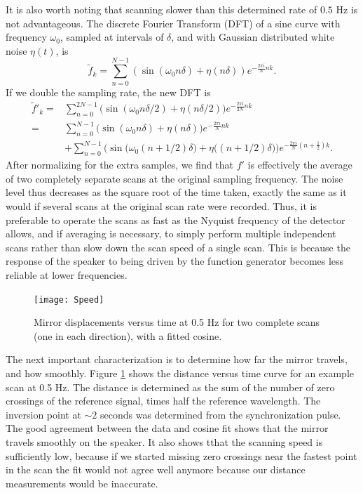 \documentclass[12pt]{puthesis}
\begin{document}
It is also worth noting that scanning slower than this determined rate of $0.5$ Hz is not advantageous. The discrete Fourier Transform (DFT) of a sine curve with frequency $\omega_{0}$, sampled at intervals of $\delta$, and with Gaussian distributed white noise $\eta(t)$, is 
\begin{equation}\label{eq:10}
\tilde f_{k} = \sum_{n=0}^{N-1}\left(\sin (\omega_{0}n\delta) +\eta(n\delta)\right)e^{-\frac{2\pi i}{N}nk}. 
\end{equation}
If we double the sampling rate, the new DFT is 
\begin{align}
  \tilde f'_{k}
  =& \sum_{n=0}^{2N-1}\Big(\sin(\omega_{0}n\delta/2) + \eta(n\delta/2)\Big)e^{-\frac{2\pi i}{2N}nk}\nonumber \\
  =& \sum_{n=0}^{N-1}\Big(\sin(\omega_{0}n\delta)+\eta(n\delta)\Big)e^{-\frac{2\pi i}{N}nk}\nonumber \\
  &+ \sum_{n=0}^{N-1}\Big(\sin\big(\omega_{0}(n+1/2)\delta\big) + \eta\big((n + 1/2)\delta\big) \Big)e^{-\frac{2\pi i}{N}(n+\frac{1}{2})k}.
  \label{eq:11}
\end{align}
After normalizing for the extra samples, we find that $f'$ is effectively the average of two completely separate scans at the original sampling frequency. The noise level thus decreases as the square root of the time taken, exactly the same as it would if several scans at the original scan rate were recorded. Thus, it is preferable to operate the scans as fast as the Nyquist frequency of the detector allows, and if averaging is necessary, to simply perform multiple independent scans rather than slow down the scan speed of a single scan. This is because the response of the speaker to being driven by the function generator becomes less reliable at lower frequencies.

\begin{figure}
  \centering
  \texttt{[image: Speed]}
  \caption{Mirror displacements versus time at 0.5 Hz for two complete scans (one in each direction), with a fitted cosine.}
  \label{fig:speed}
\end{figure}

The next important characterization is to determine how far the mirror travels, and how smoothly. Figure \ref{fig:speed} shows the distance versus time curve for an example scan at 0.5 Hz. The distance is determined as the sum of the number of zero crossings of the reference signal, times half the reference wavelength. The inversion point at $\sim 2$ seconds was determined from the synchronization pulse. The good agreement between the data and cosine fit shows that the mirror travels smoothly on the speaker. It also shows tthat the scanning speed is sufficiently low, because if we started missing zero crossings near the fastest point in the scan the fit would not agree well anymore because our distance measurements would be inaccurate.
\end{document}
